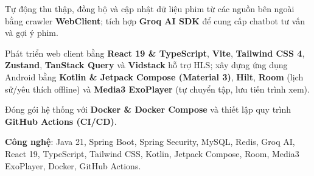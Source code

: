 \begin{cventries}
{\begin{cvitems}
        \item {Tự động thu thập, đồng bộ và cập nhật dữ liệu phim từ các nguồn bên ngoài bằng crawler \textbf{WebClient}; tích hợp \textbf{Groq AI SDK} để cung cấp chatbot tư vấn và gợi ý phim.}
        \item {Phát triển web client bằng \textbf{React 19 \& TypeScript}, \textbf{Vite}, \textbf{Tailwind CSS 4}, \textbf{Zustand}, \textbf{TanStack Query} và \textbf{Vidstack} hỗ trợ HLS; xây dựng ứng dụng Android bằng \textbf{Kotlin \& Jetpack Compose (Material 3)}, \textbf{Hilt}, \textbf{Room} (lịch sử/yêu thích offline) và \textbf{Media3 ExoPlayer} (tự chuyển tập, lưu tiến trình xem).}
        \item {Đóng gói hệ thống với \textbf{Docker \& Docker Compose} và thiết lập quy trình \textbf{GitHub Actions (CI/CD)}.}
        \item {\textbf{Công nghệ}: Java 21, Spring Boot, Spring Security, MySQL, Redis, Groq AI, React 19, TypeScript, Tailwind CSS, Kotlin, Jetpack Compose, Room, Media3 ExoPlayer, Docker, GitHub Actions.}
      \end{cvitems}
    }
\end{cventries}

